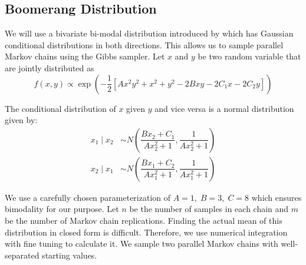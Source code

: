 \documentclass[11pt]{article}
\theoremstyle{remark}
\begin{document}
\subsection{Boomerang Distribution} \label{ex:boomerang}

We will use a bivariate bi-modal distribution introduced by \cite{gelman1991note} which has Gaussian conditional distributions in both directions. This allows us to sample parallel Markov chains using the Gibbs sampler. Let $x$ and $y$ be two random variable that are jointly distributed as 
%
\[
f(x, y) \propto \exp\left(-\dfrac{1}{2}[Ax^2y^2 + x^2 + y^2 -2Bxy  -2C_1x - 2C_2y]\right)
\]

The conditional distribution of $x$ given $y$ and vice versa is a normal distribution given by:
%
\begin{align*}
    x_1 \mid x_2 &\sim N\left(\dfrac{Bx_2 + C_1}{Ax_2^2 + 1}, \dfrac{1}{Ax_2^2 + 1}\right)\\
    x_2 \mid x_1 &\sim N\left(\dfrac{Bx_1 + C_2}{Ax_1^2 + 1}, \dfrac{1}{Ax_1^2 + 1}\right)
\end{align*}

We use a carefully chosen parameterization of $A = 1,\; B = 3,\; C = 8$ which ensures bimodality for our purpose.  Let $n$ be the number of samples in each chain and $m$ be the number of Markov chain replications. Finding the actual mean of this distribution in closed form is difficult. Therefore, we use numerical integration with fine tuning to calculate it. We sample two parallel Markov chains with well-separated starting values. 
\end{document}
